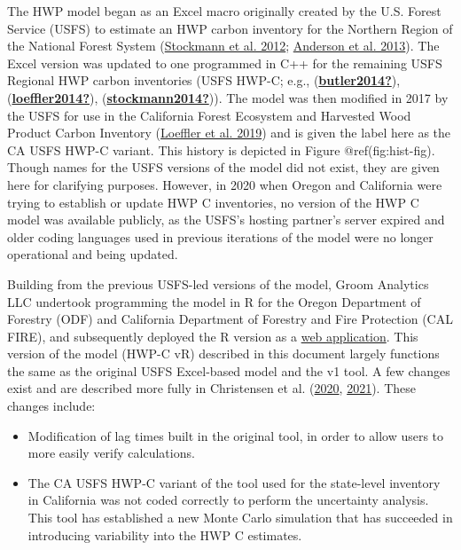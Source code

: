 \documentclass[
  openany]{book}
\providecommand{\tightlist}{%
  \setlength{\itemsep}{0pt}\setlength{\parskip}{0pt}}
\begin{document}
The HWP model began as an Excel macro originally created by the U.S.
Forest Service (USFS) to estimate an HWP carbon inventory for the
Northern Region of the National Forest System
(\protect\hyperlink{ref-stockmann2012}{Stockmann et al. 2012};
\protect\hyperlink{ref-anderson2013}{Anderson et al. 2013}). The Excel
version was updated to one programmed in C++ for the remaining USFS
Regional HWP carbon inventories (USFS HWP-C; e.g.,
(\protect\hyperlink{ref-butler2014}{\textbf{butler2014?}}),
(\protect\hyperlink{ref-loeffler2014}{\textbf{loeffler2014?}}),
(\protect\hyperlink{ref-stockmann2014}{\textbf{stockmann2014?}})). The
model was then modified in 2017 by the USFS for use in the California
Forest Ecosystem and Harvested Wood Product Carbon Inventory
(\protect\hyperlink{ref-loeffler2019}{Loeffler et al. 2019}) and is
given the label here as the CA USFS HWP-C variant. This history is
depicted in Figure @ref(fig:hist-fig). Though names for the USFS
versions of the model did not exist, they are given here for clarifying
purposes. However, in 2020 when Oregon and California were trying to
establish or update HWP C inventories, no version of the HWP C model was
available publicly, as the USFS's hosting partner's server expired and
older coding languages used in previous iterations of the model were no
longer operational and being updated.

Building from the previous USFS-led versions of the model, Groom
Analytics LLC undertook programming the model in R for the Oregon
Department of Forestry (ODF) and California Department of Forestry and
Fire Protection (CAL FIRE), and subsequently deployed the R version as a
\href{https://groomanalyticsllc.shinyapps.io/HWP-C-vR/}{web
application}. This version of the model (HWP-C vR) described in this
document largely functions the same as the original USFS Excel-based
model and the v1 tool. A few changes exist and are described more fully
in Christensen et al. (\protect\hyperlink{ref-christensen2020}{2020},
\protect\hyperlink{ref-christensen2021}{2021}). These changes include:

\begin{itemize}
\tightlist
\item
  Modification of lag times built in the original tool, in order to
  allow users to more easily verify calculations.\\
\item
  The CA USFS HWP-C variant of the tool used for the state-level
  inventory in California was not coded correctly to perform the
  uncertainty analysis. This tool has established a new Monte Carlo
  simulation that has succeeded in introducing variability into the HWP
  C estimates.
\end{itemize}
\end{document}
